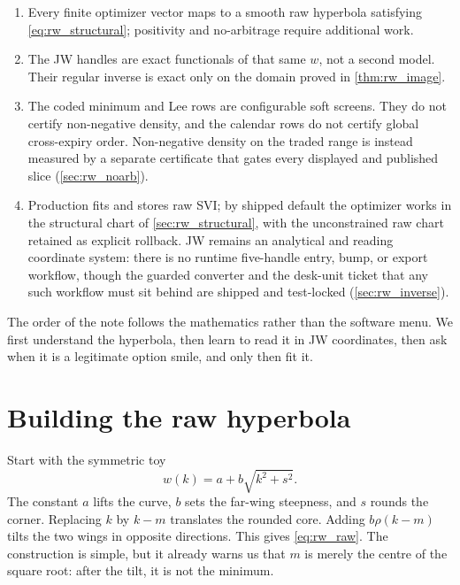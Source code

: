 \documentclass[11pt]{article}
\begin{document}
\begin{invariant}
\begin{enumerate}[leftmargin=1.6em]
\item Every finite optimizer vector maps to a smooth raw hyperbola satisfying
\eqref{eq:rw_structural}; positivity and no-arbitrage require additional work.
\item The JW handles are exact functionals of that same $w$, not a second model.
Their regular inverse is exact only on the domain proved in
\cref{thm:rw_image}.
\item The coded minimum and Lee rows are configurable soft screens.  They do
not certify non-negative density, and the calendar rows do not certify global
cross-expiry order.  Non-negative density on the traded range is instead
measured by a separate certificate that gates every displayed and published
slice (\cref{sec:rw_noarb}).
\item Production fits and stores raw SVI; by shipped default the optimizer
works in the structural chart of \cref{sec:rw_structural}, with the
unconstrained raw chart retained as explicit rollback.  JW remains an
analytical and reading coordinate system: there is no runtime five-handle
entry, bump, or export workflow, though the guarded converter and the
desk-unit ticket that any such workflow must sit behind are shipped and
test-locked (\cref{sec:rw_inverse}).
\end{enumerate}
\end{invariant}

The order of the note follows the mathematics rather than the software menu.
We first understand the hyperbola, then learn to read it in JW coordinates,
then ask when it is a legitimate option smile, and only then fit it.

\section{Building the raw hyperbola}
\label{sec:rw_geometry}

Start with the symmetric toy
\begin{equation}
w(k)=a+b\sqrt{k^2+s^2}.
\label{eq:rw_toy}
\end{equation}
The constant $a$ lifts the curve, $b$ sets the far-wing steepness, and $s$
rounds the corner.  Replacing $k$ by $k-m$ translates the rounded core.
Adding $b\rho(k-m)$ tilts the two wings in opposite directions.  This gives
\eqref{eq:rw_raw}.  The construction is simple, but it already warns us that
$m$ is merely the centre of the square root: after the tilt, it is not the
minimum.
\end{document}

